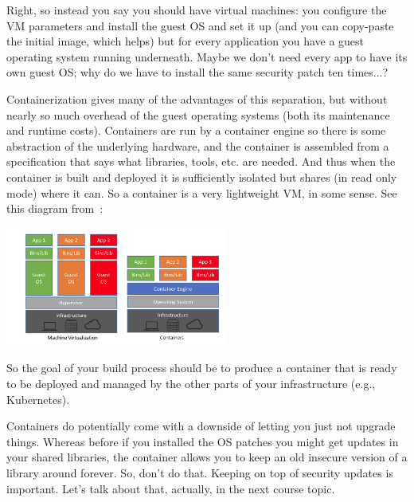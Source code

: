 Right, so instead you say you should have virtual machines: you configure the VM parameters and install the guest OS and set it up (and you can copy-paste the initial image, which helps) but for every application you have a guest operating system running underneath. Maybe we don't need every app to have its own guest OS; why do we have to install the same security patch ten times...?

Containerization gives many of the advantages of this separation, but without nearly so much overhead of the guest operating systems (both its maintenance and runtime costs). Containers are run by a container engine so there is some abstraction of the underlying hardware, and the container is assembled from a specification that says what libraries, tools, etc. are needed. And thus when the container is built and deployed it is sufficiently isolated but shares (in read only mode) where it can. So a container is a very lightweight VM, in some sense. See this diagram from~\cite{netappcontainer}:

\begin{center}
	\includegraphics[width=0.55\textwidth]{images/cvm.png}
\end{center}

So the goal of your build process should be to produce a container that is ready to be deployed and managed by the other parts of your infrastructure (e.g., Kubernetes). 

Containers do potentially come with a downside of letting you just not upgrade things. Whereas before if you installed the OS patches you might get updates in your shared libraries, the container allows you to keep an old insecure version of a library around forever. So, don't do that. Keeping on top of security updates is important. Let's talk about that, actually, in the next course topic.




